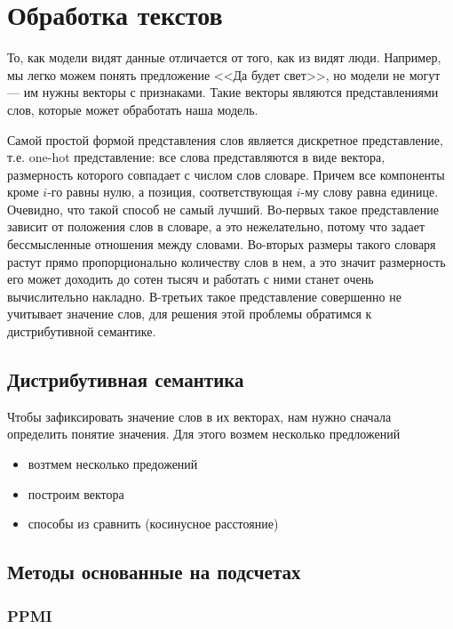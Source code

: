 \label{section:textRepsesentation}

\section{Обработка текстов}

То, как модели видят данные отличается от того, как из видят люди. Например, мы легко можем понять предложение <<Да будет свет>>, но модели не могут --- им нужны векторы с признаками. Такие векторы являются представлениями слов, которые может обработать наша модель.

\bigskip
Самой простой формой представления слов является дискретное представление, т.е. one-hot представление: все слова представляются в виде вектора, размерность которого совпадает с числом слов словаре. Причем все компоненты кроме $i$-го равны нулю, а позиция, соответствующая $i$-му слову равна единице. Очевидно, что такой способ не самый лучший. Во-первых такое представление зависит от положения слов в словаре, а это нежелательно, потому что задает бессмысленные отношения между словами. Во-вторых размеры такого словаря растут прямо пропорционально количеству слов в нем, а это значит размерность его может доходить до сотен тысяч и работать с ними станет очень вычислительно накладно. В-третьих такое представление совершенно не учитывает значение слов, для решения этой проблемы обратимся к дистрибутивной семантике.

\subsection{Дистрибутивная семантика}

Чтобы зафиксировать значение слов в их векторах, нам нужно сначала определить понятие значения. Для этого возмем несколько предложений

\bigskip
\begin{itemize}
 \item возтмем несколько предожений
 \item построим вектора
 \item способы из сравнить (косинусное расстояние)
\end{itemize}



\subsection{Методы основанные на подсчетах}

\subsubsection{PPMI}

